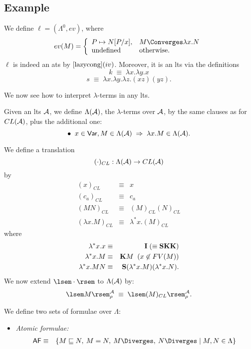 \subsection*{Example}
{\rm We define $\ell = (\Lambda^{0}, ev)$, where
\[ ev(M) = \left\{ \begin{array}{ll}
P \mapsto N[P/x] , & M \Converges \lambda x . N \\
\mbox{undefined} & \mbox{otherwise.}
\end{array} \right. \]
$\ell$ is indeed an ats by $\ref{lazycong}(iv)$. Moreover, it is an lts via the definitions
\[ k \; \equiv \; \lambda x . \lambda y . x \]
\[ s \; \equiv \; \lambda x . \lambda y . \lambda z . (x z) (y z) . \]

We now see how to interpret $\lambda$-terms in any lts.
\begin{definition}
{\rm Given an lts ${\cal A}$, we define $\Lambda ({\cal A})$, the $\lambda$-terms over ${\cal A}$, by the same clauses as for $CL({\cal A})$, plus the additional one:
\[ \bullet \;\; x \in {\sf Var}, M \in \Lambda ({\cal A}) \; \Rightarrow \; \lambda x . M \in \Lambda({\cal A}) . \]}
\end{definition}
We define a translation
\[ ( \cdot )_{CL} : \Lambda ({\cal A}) \rightarrow CL({\cal A}) \]
by
\begin{eqnarray*}
(x)_{CL} & \equiv & x \\
(c_{a})_{CL} & \equiv & c_{a} \\
(MN)_{CL} & \equiv & (M)_{CL}(N)_{CL} \\
(\lambda x . M)_{CL} & \equiv & \lambda^{\ast} x . (M)_{CL}
\end{eqnarray*}
where
\begin{eqnarray*}
\lambda^{\ast} x . x & \equiv & {\bf I} \; ( \equiv {\bf SKK}) \\
\lambda^{\ast} x . M & \equiv & {\bf K} M \;\; (x \not\in FV(M)) \\
\lambda^{\ast} x . MN & \equiv & {\bf S} (\lambda^{\ast} x . M) (\lambda^{\ast} x . N) .
\end{eqnarray*}
We now extend $\lsem \cdot \rsem$ to $\Lambda ({\cal A})$ by:
\[ \lsem M \rsem^{{\cal A}}_{\rho} \; \equiv \; \lsem (M)_{CL}\rsem^{{\cal A}}_{\rho} . \]
\begin{definition}
{\rm We define two sets of formulae over $\Lambda$:
\begin{itemize}
\item {\em Atomic formulae:}
\begin{eqnarray*}
{\sf AF} & \equiv & \{ M \sqsubseteq N, \: M = N, \: M \Diverges , \: N \Diverges \; | \;   M, N \in \Lambda \}

\end{eqnarray*}
\end{itemize}}
\end{definition}}
